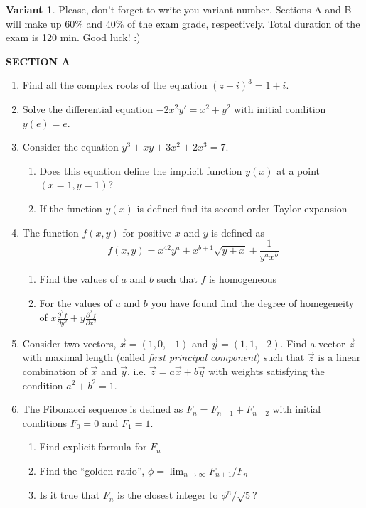 \documentclass[12pt]{article} %
\theoremstyle{definition} %
\begin{document}
\textbf{Variant 1}. Please, don't forget to write you variant number. Sections A and B will make up 60\% and 40\% of the exam grade, respectively. Total duration of the exam is 120 min. Good luck! :)


\textbf{SECTION A}

\begin{enumerate}

\item Find all the complex roots of the equation $(z+i)^3=1+i$.

\item Solve the differential equation $-2x^2y'=x^2+y^2$ with initial condition $y(e)=e$.

\item Consider the equation $y^3+xy+3x^2+2x^3=7$.
\begin{enumerate}
\item Does this equation define the implicit function $y(x)$ at a point $(x=1,y=1)$?
\item If the function $y(x)$ is defined find its second order Taylor expansion
\end{enumerate}

\item The function $f(x,y)$ for positive $x$ and $y$ is defined as
\[
f(x,y)=x^{42}y^a + x^{b+1}\sqrt{y+x}+\frac{1}{y^a x^b}
\]

\begin{enumerate}
\item Find the values of $a$ and $b$ such that $f$ is homogeneous
\item For the values of  $a$ and $b$ you have found find the degree of homegeneity of $x\frac{\partial^2 f}{\partial y^2} +y\frac{\partial^2 f}{\partial x^2}$
\end{enumerate}

\item Consider two vectors, $\vec{x}=(1,0,-1)$ and $\vec{y}=(1,1,-2)$. Find a vector $\vec{z}$ with maximal length (called \textit{first principal component}) such that $\vec{z}$ is a linear combination of $\vec{x}$ and $\vec{y}$, i.e. $\vec{z}=a \vec{x} + b \vec{y}$ with weights satisfying the condition $a^2+b^2=1$.

\item The Fibonacci sequence is defined as $F_n=F_{n-1}+F_{n-2}$ with initial conditions $F_0=0$ and $F_1=1$.
\begin{enumerate}
\item Find explicit formula for $F_n$
\item Find the ``golden ratio'', $\phi=\lim_{n\to\infty} F_{n+1}/F_n$
\item Is it true that $F_n$ is the closest integer to $\phi^n/\sqrt{5}$?
\end{enumerate}



\end{enumerate}
\end{document}
